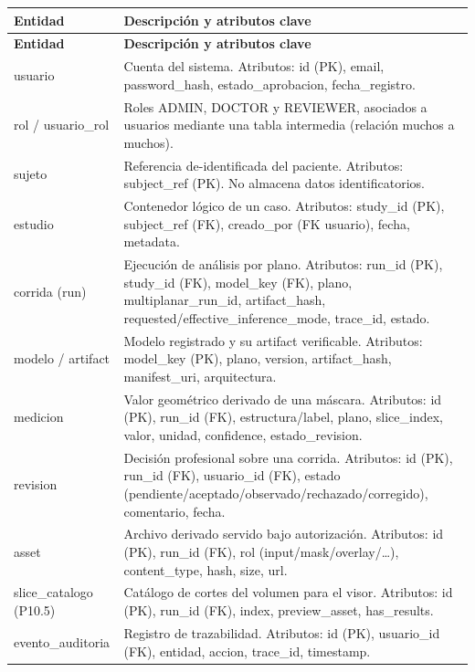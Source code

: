 {\footnotesize
\setlength{\LTleft}{0pt}
\setlength{\LTright}{0pt}
\setlength{\tabcolsep}{2pt}
\renewcommand{\arraystretch}{1.18}
\label{tab:arch-entidades-principales}
\begin{longtable}{>{\raggedright\arraybackslash}p{} >{\raggedright\arraybackslash}p{}}
\hline
\textbf{Entidad} & \textbf{Descripción y atributos clave} \\
\hline
\endfirsthead
\hline
\textbf{Entidad} & \textbf{Descripción y atributos clave} \\
\hline
\endhead
\hline
\endfoot
usuario & Cuenta del sistema. Atributos: id (PK), email, password\_hash, estado\_aprobacion, fecha\_registro. \\
rol / usuario\_rol & Roles ADMIN, DOCTOR y REVIEWER, asociados a usuarios mediante una tabla intermedia (relación muchos a muchos). \\
sujeto & Referencia de-identificada del paciente. Atributos: subject\_ref (PK). No almacena datos identificatorios. \\
estudio & Contenedor lógico de un caso. Atributos: study\_id (PK), subject\_ref (FK), creado\_por (FK usuario), fecha, metadata. \\
corrida (run) & Ejecución de análisis por plano. Atributos: run\_id (PK), study\_id (FK), model\_key (FK), plano, multiplanar\_run\_id, artifact\_hash, requested/effective\_inference\_mode, trace\_id, estado. \\
modelo / artifact & Modelo registrado y su artifact verificable. Atributos: model\_key (PK), plano, version, artifact\_hash, manifest\_uri, arquitectura. \\
medicion & Valor geométrico derivado de una máscara. Atributos: id (PK), run\_id (FK), estructura/label, plano, slice\_index, valor, unidad, confidence, estado\_revision. \\
revision & Decisión profesional sobre una corrida. Atributos: id (PK), run\_id (FK), usuario\_id (FK), estado (pendiente/aceptado/observado/rechazado/corregido), comentario, fecha. \\
asset & Archivo derivado servido bajo autorización. Atributos: id (PK), run\_id (FK), rol (input/mask/overlay/…), content\_type, hash, size, url. \\
slice\_catalogo (P10.5) & Catálogo de cortes del volumen para el visor. Atributos: id (PK), run\_id (FK), index, preview\_asset, has\_results. \\
evento\_auditoria & Registro de trazabilidad. Atributos: id (PK), usuario\_id (FK), entidad, accion, trace\_id, timestamp. \\
\hline
\end{longtable}
}

